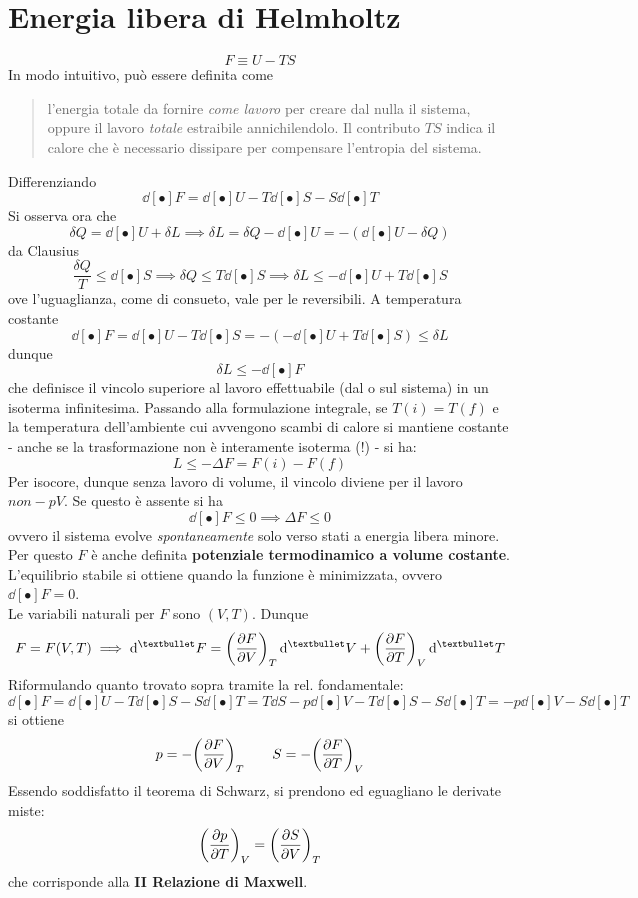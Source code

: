 \documentclass[10pt, oneside]{book}
\begin{document}
\section{Energia libera di Helmholtz}
\[F \equiv U - TS\]
In modo intuitivo, può essere definita come
\begin{quote}
l'energia totale da fornire \textit{come lavoro} per creare dal nulla il sistema, oppure il lavoro \textit{totale} estraibile annichilendolo. Il contributo $TS$ indica il calore che è necessario dissipare per compensare l'entropia del sistema.
\end{quote}
Differenziando
\[\dd[•]{F} = \dd[•]{U} - T\dd[•]{S} - S\dd[•]{T}\]
Si osserva ora che
\[\delta Q = \dd[•]{U} + \delta L \implies \delta L = \delta Q - \dd[•]{U} = - (\dd[•]{U} - \delta Q)\]
da Clausius
\[\frac{\delta Q}{T} \leq \dd[•]{S} \implies \delta Q \leq T \dd[•]{S} \implies \delta L \leq - \dd[•]{U} + T \dd[•]{S}\]
ove l'uguaglianza, come di consueto, vale per le reversibili. A temperatura costante
\[\dd[•]{F} = \dd[•]{U} - T\dd[•]{S} = - (- \dd[•]{U} + T \dd[•]{S}) \leq \delta L\]
dunque
\[\delta L \leq - \dd[•]{F}\]
che definisce il vincolo superiore al lavoro effettuabile (dal o sul sistema) in un isoterma infinitesima. Passando alla formulazione integrale, se $T(i) = T(f)$ e la temperatura dell'ambiente cui avvengono scambi di calore si mantiene costante - anche se la trasformazione non è interamente isoterma (!) - si ha:
\[L \leq - \Delta F = F(i) - F(f)\]
Per isocore, dunque senza lavoro di volume,  il vincolo diviene per il lavoro $non-pV$. Se questo è assente si ha
\[\dd[•]{F} \leq 0 \implies \Delta F \leq 0\] 
ovvero il sistema evolve \textit{spontaneamente} solo verso stati a energia libera minore. Per questo $F$ è anche definita \textbf{potenziale termodinamico a volume costante}.\\
L'equilibrio stabile si ottiene quando la funzione è minimizzata, ovvero $\dd[•]{F} = 0$.\\Le variabili naturali per $F$ sono $(V,T)$. Dunque
\[F = F(V,T) \implies \dd[•]{F} = \bigg(\pdv{F}{V}\bigg)_T \dd[•]{V} + \bigg(\pdv{F}{T}\bigg)_V \dd[•]{T}\]
Riformulando quanto trovato sopra tramite la rel. fondamentale:
\[\dd[•]{F} = \dd[•]{U} - T \dd[•]{S} -S \dd[•]{T}= T \dd{S} - p \dd[•]{V}  - T \dd[•]{S} - S \dd[•]{T}= -p \dd[•]{V} - S \dd[•]{T}\]
si ottiene
\[p = - \bigg(\pdv{F}{V}\bigg)_T \qquad S = - \bigg(\pdv{F}{T}\bigg)_V\]
Essendo soddisfatto il teorema di Schwarz, si prendono ed eguagliano le derivate miste:
\[\bigg(\pdv{p}{T}\bigg)_V = \bigg(\pdv{S}{V}\bigg)_T\]
che corrisponde alla \textbf{II Relazione di Maxwell}.\\
\end{document}
